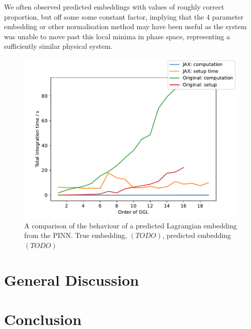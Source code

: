 We often observed predicted embeddings with values of roughly correct proportion, but off some some constant factor, implying that the 4 parameter embedding or other normalisation method may have been useful as the system was unable to move past this local minima in phase space, representing a sufficiently similar physical system. 

\begin{figure}[t]
  \label{fig:model-prediction}
  \includegraphics[width=\columnwidth]{figures/dho_r_runtime_linear.pdf}
  \caption{A comparison of the behaviour of a predicted Lagrangian embedding from the PINN. True embedding, $(TODO)$, predicted embedding $(TODO)$}
\end{figure}

\section{General Discussion}




\section{Conclusion}
